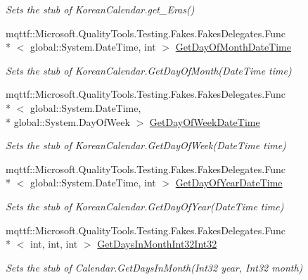 \begin{DoxyCompactItemize}
\begin{DoxyCompactList}\small\item\em Sets the stub of Korean\-Calendar.\-get\-\_\-\-Eras()\end{DoxyCompactList}\item 
mqttf\-::\-Microsoft.\-Quality\-Tools.\-Testing.\-Fakes.\-Fakes\-Delegates.\-Func\\*
$<$ global\-::\-System.\-Date\-Time, int $>$ \hyperlink{class_system_1_1_globalization_1_1_fakes_1_1_stub_korean_calendar_a6224f223719dad9e4789a540d79a608a}{Get\-Day\-Of\-Month\-Date\-Time}
\begin{DoxyCompactList}\small\item\em Sets the stub of Korean\-Calendar.\-Get\-Day\-Of\-Month(\-Date\-Time time)\end{DoxyCompactList}\item 
mqttf\-::\-Microsoft.\-Quality\-Tools.\-Testing.\-Fakes.\-Fakes\-Delegates.\-Func\\*
$<$ global\-::\-System.\-Date\-Time, \\*
global\-::\-System.\-Day\-Of\-Week $>$ \hyperlink{class_system_1_1_globalization_1_1_fakes_1_1_stub_korean_calendar_a5850284cfc6cea0125cf53ebf61c9d9f}{Get\-Day\-Of\-Week\-Date\-Time}
\begin{DoxyCompactList}\small\item\em Sets the stub of Korean\-Calendar.\-Get\-Day\-Of\-Week(\-Date\-Time time)\end{DoxyCompactList}\item 
mqttf\-::\-Microsoft.\-Quality\-Tools.\-Testing.\-Fakes.\-Fakes\-Delegates.\-Func\\*
$<$ global\-::\-System.\-Date\-Time, int $>$ \hyperlink{class_system_1_1_globalization_1_1_fakes_1_1_stub_korean_calendar_a9cbfba7e9b033278b320077ab12c7baa}{Get\-Day\-Of\-Year\-Date\-Time}
\begin{DoxyCompactList}\small\item\em Sets the stub of Korean\-Calendar.\-Get\-Day\-Of\-Year(\-Date\-Time time)\end{DoxyCompactList}\item 
mqttf\-::\-Microsoft.\-Quality\-Tools.\-Testing.\-Fakes.\-Fakes\-Delegates.\-Func\\*
$<$ int, int, int $>$ \hyperlink{class_system_1_1_globalization_1_1_fakes_1_1_stub_korean_calendar_a96bcde7ccaa3f3a82685b0eeef802916}{Get\-Days\-In\-Month\-Int32\-Int32}
\begin{DoxyCompactList}\small\item\em Sets the stub of Calendar.\-Get\-Days\-In\-Month(\-Int32 year, Int32 month)\end{DoxyCompactList}\item 

\end{DoxyCompactItemize}
